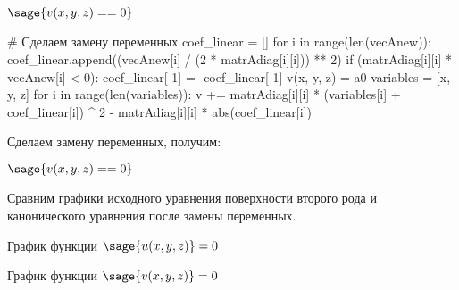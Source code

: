 \documentclass[14pt, a4paper]{article}
\begin{document}
$\sage{v(x, y, z) == 0}$

\begin{sagesilent}
    # Сделаем замену переменных
    coef_linear = []
    for i in range(len(vecAnew)):
        coef_linear.append((vecAnew[i] / (2 * matrAdiag[i][i])) ** 2)
        if (matrAdiag[i][i] * vecAnew[i] < 0):
            coef_linear[-1] = -coef_linear[-1]
    v(x, y, z) = a0
    variables = [x, y, z]
    for i in range(len(variables)):
        v += matrAdiag[i][i] * (variables[i] + coef_linear[i]) ^ 2 - matrAdiag[i][i] * abs(coef_linear[i])
\end{sagesilent}

Сделаем замену переменных, получим:

$\sage{v(x, y, z) == 0}$

\pagebreak

Сравним графики исходного уравнения поверхности второго рода и канонического уравнения после замены переменных.

График функции $\sage{u(x, y, z)} = 0$
\begin{center}
\end{center}

График функции $\sage{v(x, y, z)} = 0$
\begin{center}
\end{center}
\end{document}
